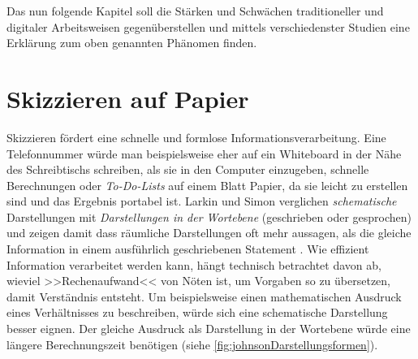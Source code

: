 \medskip Das nun folgende Kapitel soll die Stärken und Schwächen traditioneller und digitaler Arbeitsweisen gegenüberstellen und mittels verschiedenster Studien eine Erklärung zum oben genannten Phänomen finden. %

\section{Skizzieren auf Papier} 
Skizzieren fördert eine schnelle und formlose Informationsverarbeitung. Eine Telefonnummer würde man beispielsweise eher auf ein Whiteboard in der Nähe des Schreibtischs schreiben, als sie in den Computer einzugeben, schnelle Berechnungen oder \emph{To-Do-Lists} auf einem Blatt Papier, da sie leicht zu erstellen sind und das Ergebnis portabel ist.
Larkin und Simon verglichen \emph{schematische} Darstellungen mit \emph{Darstellungen in der Wortebene} (geschrieben oder gesprochen) und zeigen damit dass räumliche Darstellungen oft mehr aussagen, als die gleiche Information in einem ausführlich geschriebenen Statement \citep{Larkin:1987}. Wie effizient Information verarbeitet werden kann, hängt technisch betrachtet davon ab, wieviel >>Rechenaufwand<< von Nöten ist, um Vorgaben so zu übersetzen, damit Verständnis entsteht. Um beispielsweise einen mathematischen Ausdruck eines Verhältnisses zu beschreiben, würde sich eine schematische Darstellung besser eignen. Der gleiche Ausdruck als Darstellung in der Wortebene würde eine längere Berechnungszeit benötigen (siehe \autoref{fig:johnsonDarstellungsformen}).

